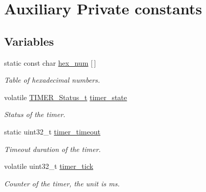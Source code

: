 \hypertarget{group___k_n_x___aux___private___consts}{}\section{Auxiliary Private constants}
\label{group___k_n_x___aux___private___consts}
\subsection*{Variables}
\begin{DoxyCompactItemize}
\item 
static const char \hyperlink{group___k_n_x___aux___private___consts_ga938e545954f0ddfa9a048c6fc3f30776}{hex\+\_\+num} \mbox{[}$\,$\mbox{]}
\begin{DoxyCompactList}\small\item\em Table of hexadecimal numbers. \end{DoxyCompactList}\item 
volatile \hyperlink{group___k_n_x___aux___exported___types_ga6ed3d972c6c5995cb3fe41995f121b41}{T\+I\+M\+E\+R\+\_\+\+Status\+\_\+t} \hyperlink{group___k_n_x___aux___private___consts_ga23c914a3038b7651aeb6bc1f444fe805}{timer\+\_\+state}\hypertarget{group___k_n_x___aux___private___consts_ga23c914a3038b7651aeb6bc1f444fe805}{}\label{group___k_n_x___aux___private___consts_ga23c914a3038b7651aeb6bc1f444fe805}

\begin{DoxyCompactList}\small\item\em Status of the timer. \end{DoxyCompactList}\item 
static uint32\+\_\+t \hyperlink{group___k_n_x___aux___private___consts_ga9425be3f8a3c77c3e1f30e8759fc65e8}{timer\+\_\+timeout}\hypertarget{group___k_n_x___aux___private___consts_ga9425be3f8a3c77c3e1f30e8759fc65e8}{}\label{group___k_n_x___aux___private___consts_ga9425be3f8a3c77c3e1f30e8759fc65e8}

\begin{DoxyCompactList}\small\item\em Timeout duration of the timer. \end{DoxyCompactList}\item 
volatile uint32\+\_\+t \hyperlink{group___k_n_x___aux___private___consts_ga8c702713be164664bf7d3c5f9cc9002d}{timer\+\_\+tick}\hypertarget{group___k_n_x___aux___private___consts_ga8c702713be164664bf7d3c5f9cc9002d}{}\label{group___k_n_x___aux___private___consts_ga8c702713be164664bf7d3c5f9cc9002d}

\begin{DoxyCompactList}\small\item\em Counter of the timer, the unit is ms. \end{DoxyCompactList}\end{DoxyCompactItemize}


